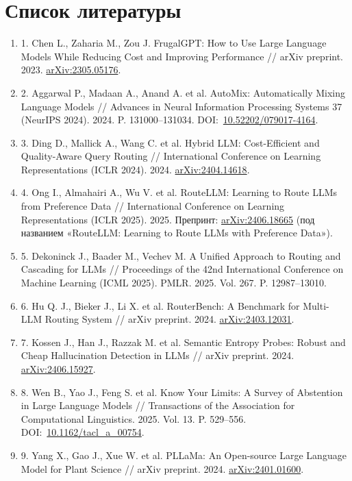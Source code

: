 \documentclass[14pt,a4paper]{extarticle}
\begin{document}
\section*{Список литературы}
\begingroup\sloppy\fontsize{11}{13}\selectfont \begin{enumerate}[label={},leftmargin=0.9cm,itemindent=-0.9cm,itemsep=0pt,parsep=0pt,topsep=2pt]
\item 1. Chen L., Zaharia M., Zou J. FrugalGPT: How to Use Large Language Models While Reducing Cost and Improving Performance // arXiv preprint. 2023. \href{https://arxiv.org/abs/2305.05176}{arXiv:2305.05176}.
\item 2. Aggarwal P., Madaan A., Anand A. et al. AutoMix: Automatically Mixing Language Models // Advances in Neural Information Processing Systems 37 (NeurIPS 2024). 2024. P. 131000–131034. DOI:~\href{https://doi.org/10.52202/079017-4164}{10.52202/079017-4164}.
\item 3. Ding D., Mallick A., Wang C. et al. Hybrid LLM: Cost-Efficient and Quality-Aware Query Routing // International Conference on Learning Representations (ICLR 2024). 2024. \href{https://arxiv.org/abs/2404.14618}{arXiv:2404.14618}.
\item 4. Ong I., Almahairi A., Wu V. et al. RouteLLM: Learning to Route LLMs from Preference Data // International Conference on Learning Representations (ICLR 2025). 2025. Препринт: \href{https://arxiv.org/abs/2406.18665}{arXiv:2406.18665} (под названием «RouteLLM: Learning to Route LLMs with Preference Data»).
\item 5. Dekoninck J., Baader M., Vechev M. A Unified Approach to Routing and Cascading for LLMs // Proceedings of the 42nd International Conference on Machine Learning (ICML 2025). PMLR. 2025. Vol. 267. P. 12987–13010.
\item 6. Hu Q. J., Bieker J., Li X. et al. RouterBench: A Benchmark for Multi-LLM Routing System // arXiv preprint. 2024. \href{https://arxiv.org/abs/2403.12031}{arXiv:2403.12031}.
\item 7. Kossen J., Han J., Razzak M. et al. Semantic Entropy Probes: Robust and Cheap Hallucination Detection in LLMs // arXiv preprint. 2024. \href{https://arxiv.org/abs/2406.15927}{arXiv:2406.15927}.
\item 8. Wen B., Yao J., Feng S. et al. Know Your Limits: A Survey of Abstention in Large Language Models // Transactions of the Association for Computational Linguistics. 2025. Vol. 13. P. 529–556. DOI:~\href{https://doi.org/10.1162/tacl_a_00754}{10.1162/tacl\_a\_00754}.
\item 9. Yang X., Gao J., Xue W. et al. PLLaMa: An Open-source Large Language Model for Plant Science // arXiv preprint. 2024. \href{https://arxiv.org/abs/2401.01600}{arXiv:2401.01600}.

\end{enumerate}
\end{document}
